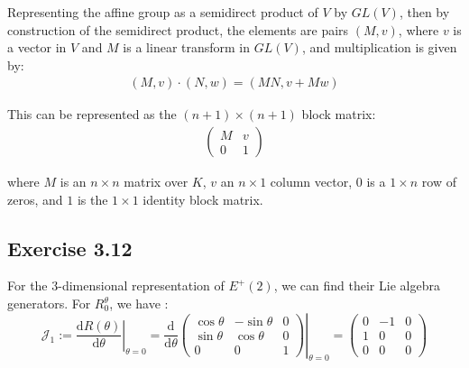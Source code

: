 \documentclass[]{ctexart}
\begin{document}
				Representing the affine group as a semidirect product of $ V $ by $ GL(V) $, then by construction of the semidirect product, the elements are pairs $ (M, v) $, where $ v $ is a vector in $ V $ and $ M $ is a linear transform in $ GL(V) $, and multiplication is given by: 
					\begin{equation*}
					\begin{aligned}
						( M , v ) \cdot ( N , w ) = ( M N , v + M w ) 
					\end{aligned}
					\end{equation*}
					
				This can be represented as the $ (n + 1) × (n + 1) $ block matrix: 
					\begin{equation*}
					\begin{aligned}
						\left(\begin{array}{c|c}
						M & v \\
						\hline 0 & 1
						\end{array}\right)
					\end{aligned}
					\end{equation*}
					
				where $ M $ is an $ n × n $ matrix over $ K $, $ v $ an $ n × 1 $ column vector, $ 0 $ is a $ 1 × n $ row of zeros, and $ 1 $ is the $ 1 × 1 $ identity block matrix. 
				
	\subsection{Exercise 3.12}
		For the 3-dimensional representation of $E^+(2)$, we can find their Lie algebra generators. For $ R^{\theta}_0 $, we have :
			\begin{equation*}
			\mathcal{J}_1:=\left.\frac{\mathrm{d} R(\theta)}{\mathrm{d} \theta}\right|_{\theta=0}=\left.\frac{\mathrm{d}}{\mathrm{d} \theta }\left(\begin{array}{ccc}
			\cos \theta & -\sin \theta & 0  \\
			\sin \theta & \cos \theta & 0 \\
			0 & 0 & 1
			\end{array}\right)\right|_{\theta=0}=\left(\begin{array}{ccc}
			0 & -1 & 0 \\
			1 & 0  & 0 \\
			0 & 0  & 0
			\end{array}\right)
			\end{equation*}
			
\end{document}
